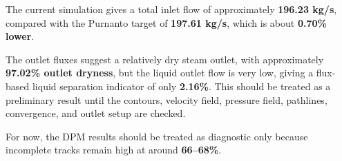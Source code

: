 \documentclass[
  11pt,
]{article}
\begin{document}
The current simulation gives a total inlet flow of approximately
\textbf{196.23 kg/s}, compared with the Purnanto target of
\textbf{197.61 kg/s}, which is about \textbf{0.70\% lower}.

The outlet fluxes suggest a relatively dry steam outlet, with
approximately \textbf{97.02\% outlet dryness}, but the liquid outlet
flow is very low, giving a flux-based liquid separation indicator of
only \textbf{2.16\%}. This should be treated as a preliminary result
until the contours, velocity field, pressure field, pathlines,
convergence, and outlet setup are checked.

For now, the DPM results should be treated as diagnostic only because
incomplete tracks remain high at around \textbf{66--68\%}.
\end{document}
